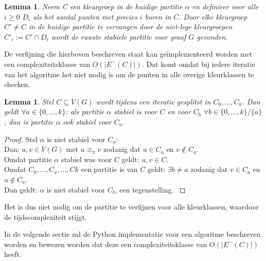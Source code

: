 \documentclass[twoside]{article}
\newtheorem{lemma}[theorem]{Lemma}
\begin{document}
\begin{multicols}{2}
\begin{lemma}
Neem C een kleurgroep in de huidige partitie $\alpha$ en definieer voor alle $i \geq 0$ $D_{i}$ als het aantal punten met precies $i$ buren in $C$. Door elke kleurgroep $C' \neq C$ in de huidige partitie te vervangen door de niet-lege kleurgroepen $C'_{i} := C'\cap D_{i}$ wordt de ruwste stabiele partitie voor graaf $G$ gevonden.
\cite{slides_DFA}
\end{lemma}


De verfijning die hierboven beschreven staat kan ge\"implementeerd worden met een complexiteitsklasse van $O(|E^{-}(C)|)$. Dat komt omdat bij iedere iteratie van het algoritme het niet nodig is om de punten in alle overige kleurklassen te checken.

\begin{lemma}
Stel $C \subseteq V(G)$ wordt tijdens een iteratie gesplitst in $C_{0}, \ldots, C_{k}$. Dan geldt $\forall a \in \{0,\ldots,k\}$: als partitie $\alpha$ stabiel is voor $C$ en voor $C_{b}$ $\forall b \in \{0,\ldots,k\}/\{a\}$, dan is partitie $\alpha$ ook stabiel voor $C_{a}$.
\end{lemma}

\begin{proof}
Stel $\alpha$ is niet stabiel voor $C_{a}$:\\
Dan: $ u,v \in V(G)$ met $u \equiv_{\pi} v$ zodanig dat $u \in C_{a}$ en $v \not \in C_{a}$.\\
Omdat partitie $\alpha$ stabiel was voor $C$ geldt: $u,v \in C$.\\
Omdat $C_{0},\ldots,C_{a},\ldots,C{k}$ een partitie is van $C$ geldt: $\exists b \neq a $ zodanig dat $v \in C_{a}$ en $u \not \in C_{a}$.\\
Dan geldt: $\alpha$ is niet stabiel voor $C_{b}$, een tegenstelling.
\cite{slides_DFA}
\end{proof}


Het is dus niet nodig om de partitie te verfijnen voor alle kleurklassen, waardoor de tijdscomplexiteit stijgt.

In de volgende sectie zal de Python implementatie voor een algoritme beschreven worden en bewezen worden dat deze een complexiteitsklasse van $O(|E^{-}(C)|)$ heeft.


\end{multicols}
\end{document}
